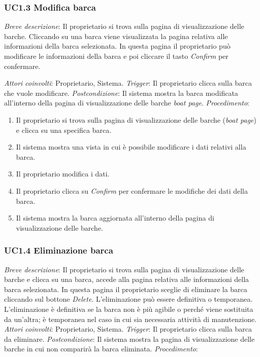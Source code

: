 \subsubsection{UC1.3 Modifica barca}

 \emph{Breve descrizione}: Il proprietario si trova sulla pagina di visualizzazione delle barche. Cliccando su una barca viene visualizzata la pagina relativa alle informazioni della barca selezionata. In questa pagina il proprietario può modificare le informazioni della barca e poi cliccare il tasto  \textit{Confirm} per confermare. 

\medbreak
 \emph{Attori coinvolti}: Proprietario, Sistema.\medbreak
 \emph{Trigger}: Il proprietario clicca sulla barca che vuole modificare.\medbreak
 \emph{Postcondizione}: Il sistema mostra la barca modificata all'interno della pagina di visualizzazione delle barche \textit{boat page}.\medbreak
 \emph{Procedimento}:

\begin{enumerate}
    \item Il proprietario si trova sulla pagina di visualizzazione delle barche (\textit{boat page}) e clicca su una specifica barca.
    \item Il sistema mostra una vista in cui è possibile modificare i dati relativi alla barca.
    \item Il proprietario modifica i dati.
    \item Il proprietario clicca su \textit{Confirm} per confermare le modifiche dei dati della barca.
    \item Il sistema mostra la barca aggiornata all'interno della pagina di visualizzazione delle barche.
\end{enumerate}

\subsubsection{UC1.4 Eliminazione barca}

 \emph{Breve descrizione}: Il proprietario si trova sulla pagina di visualizzazione delle barche e clicca su una barca, accede alla pagina relativa alle informazioni della barca selezionata. In questa pagina il proprietario sceglie di eliminare la barca cliccando sul bottone \textit{Delete}. 
L'eliminazione può essere definitiva o temporanea. L'eliminazione è definitiva se la barca non è più agibile o perché viene sostituita da un'altra;
è temporanea nel caso in cui sia necessaria attività di manutenzione.\medbreak
 \emph{Attori coinvolti}: Proprietario, Sistema.\medbreak
 \emph{Trigger}: Il proprietario clicca sulla barca da eliminare.\medbreak
 \emph{Postcondizione}: Il sistema mostra la pagina di visualizzazione delle barche in cui non comparirà la barca eliminata.\medbreak
 \emph{Procedimento}:

